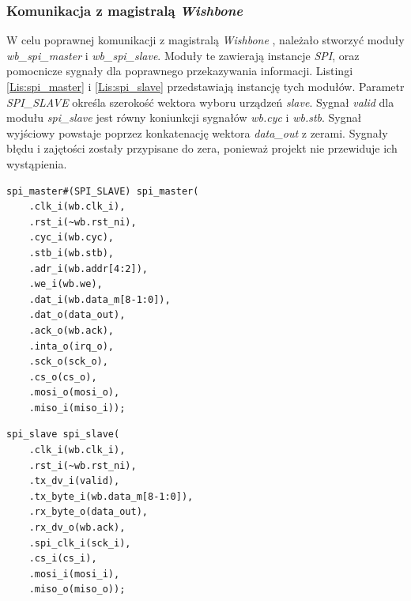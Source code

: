 \documentclass[11pt,a4paper]{article}
\begin{document}
		\subsubsection{Komunikacja z magistralą \textit{Wishbone}}
		\hspace{5mm} W celu poprawnej komunikacji z magistralą \textit{Wishbone} , należało stworzyć moduły \textit{wb\_spi\_master} i \textit{wb\_spi\_slave}. Moduły te zawierają instancje \textit{SPI}, oraz pomocnicze sygnały dla poprawnego przekazywania informacji. Listingi \ref{Lis:spi_master} i \ref{Lis:spi_slave} przedstawiają instancję tych modułów. Parametr \textit{SPI\_SLAVE} określa szerokość wektora wyboru urządzeń \textit{slave}. Sygnał \textit{valid} dla modułu \textit{spi\_slave} jest równy koniunkcji sygnałów \textit{wb.cyc} i \textit{wb.stb}. Sygnał wyjściowy powstaje poprzez konkatenację wektora \textit{data\_out} z zerami. Sygnały błędu i zajętości zostały przypisane do zera, ponieważ projekt nie przewiduje ich wystąpienia.\\
		\begin{minipage}{.49\textwidth}
\begin{scriptsize}
\begin{lstlisting}[label=Lis:spi_master,caption=Instancja pamięci instrukcji]
    spi_master#(SPI_SLAVE) spi_master(
    .clk_i(wb.clk_i),
    .rst_i(~wb.rst_ni),
    .cyc_i(wb.cyc),
    .stb_i(wb.stb),
    .adr_i(wb.addr[4:2]),
    .we_i(wb.we),
    .dat_i(wb.data_m[8-1:0]),
    .dat_o(data_out),
    .ack_o(wb.ack),
    .inta_o(irq_o),
    .sck_o(sck_o),
    .cs_o(cs_o),
    .mosi_o(mosi_o),
    .miso_i(miso_i));
\end{lstlisting}
\end{scriptsize}
\end{minipage} \hspace{.02\textwidth}
\begin{minipage}{.49\textwidth}
\begin{scriptsize}
\begin{lstlisting}[label=Lis:spi_slave,caption=Instancja pamięci danych]
    spi_slave spi_slave(
    .clk_i(wb.clk_i),
    .rst_i(~wb.rst_ni),
    .tx_dv_i(valid),
    .tx_byte_i(wb.data_m[8-1:0]),
    .rx_byte_o(data_out),
    .rx_dv_o(wb.ack),
    .spi_clk_i(sck_i),
    .cs_i(cs_i),
    .mosi_i(mosi_i),
    .miso_o(miso_o));
\end{lstlisting}
\end{scriptsize}
\end{minipage}
\end{document}
